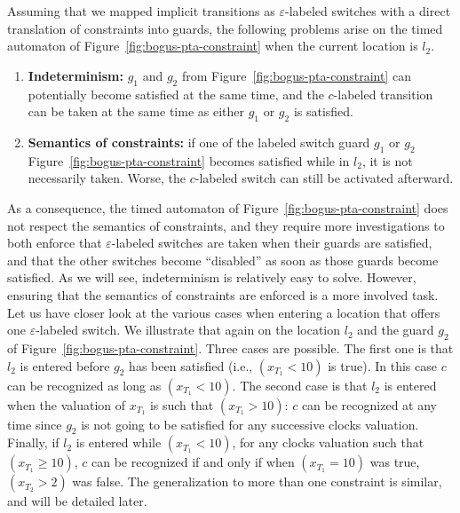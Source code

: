 Assuming that we mapped implicit transitions as $\varepsilon$-labeled switches with a direct translation of \MInvoke constraints into guards, the following problems arise on the timed automaton of Figure~\ref{fig:bogus-pta-constraint} when the current location is $l_2$.
\begin{enumerate}

	\item \textbf{Indeterminism:} $g_1$ and $g_2$ from Figure~\ref{fig:bogus-pta-constraint} can potentially become satisfied at the same time, and the $c$-labeled transition can be taken at the same time as either $g_1$ or $g_2$ is satisfied.
	
	\item \textbf{Semantics of \MInvoke constraints:} if one of the labeled switch guard $g_1$ or $g_2$ Figure~\ref{fig:bogus-pta-constraint} becomes satisfied while in $l_2$, it is not necessarily taken. Worse, the $c$-labeled switch can still be activated afterward.

\end{enumerate}
As a consequence, the timed automaton of Figure~\ref{fig:bogus-pta-constraint} does not respect the semantics of \MInvoke constraints, and they require more investigations to both enforce that $\varepsilon$-labeled switches are taken when their guards are satisfied, and that the other switches become ``disabled'' as soon as those guards become satisfied. As we will see, indeterminism is relatively easy to solve. However, ensuring that the semantics of \MInvoke constraints are enforced is a more involved task.\\

Let us have closer look at the various cases when entering a location that offers one $\varepsilon$-labeled switch. We illustrate that again on the location $l_2$ and the guard $g_2$ of Figure~\ref{fig:bogus-pta-constraint}.
Three cases are possible. The first one is that $l_2$ is entered before $g_2$ has been satisfied (i.e., $(x_{T_1} < 10)$ is true). In this case $c$ can be recognized as long as $(x_{T_1} < 10)$. The second case is that $l_2$ is entered when the valuation of $x_{T_1}$ is such that $(x_{T_1} > 10)$: $c$ can be recognized at any time since $g_2$ is not going to be satisfied for any successive clocks valuation. Finally, if $l_2$ is entered while $(x_{T_1} < 10)$, for any clocks valuation such that $(x_{T_1} \geq 10)$, $c$ can be recognized if and only if when $(x_{T_1} = 10)$ was true, $(x_{T_2} > 2)$ was false. The generalization to more than one constraint is similar, and will be detailed later. \\

